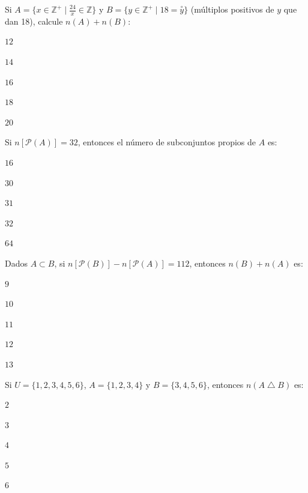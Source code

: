 \begin{tcolorbox}[
  enhanced, colback=AzulClaro!40, colframe=AzulMedio,
  arc=2pt, boxrule=0.5pt, fonttitle=\sffamily\bfseries\small,
  title={Nivel Intermedio}, left=4pt, right=4pt, top=3pt, bottom=3pt
]\end{tcolorbox}

\begin{multicols}{2}

\ejercicio Si $A = \{x \in \mathbb{Z}^{+} \mid \tfrac{24}{x} \in \mathbb{Z}\}$
y $B = \{y \in \mathbb{Z}^{+} \mid 18 = \overset{\circ}{y}\}$
(m\'ultiplos positivos de $y$ que dan 18), calcule $n(A) + n(B)$:
\begin{alternativas}
  \item $12$
  \item $14$
  \item $16$
  \item $18$
  \item $20$
\end{alternativas}

\vspace{0.3cm}

\ejercicio Si $n[\mathcal{P}(A)] = 32$, entonces el n\'umero de subconjuntos
propios de $A$ es:
\begin{alternativas}
  \item $16$
  \item $30$
  \item $31$
  \item $32$
  \item $64$
\end{alternativas}

\vspace{0.3cm}

\ejercicio Dados $A \subset B$, si $n[\mathcal{P}(B)] - n[\mathcal{P}(A)] = 112$,
entonces $n(B) + n(A)$ es:
\begin{alternativas}
  \item $9$
  \item $10$
  \item $11$
  \item $12$
  \item $13$
\end{alternativas}

\vspace{0.3cm}

\ejercicio Si $U = \{1,2,3,4,5,6\}$, $A = \{1,2,3,4\}$ y $B = \{3,4,5,6\}$,
entonces $n(A \mathbin{\triangle} B)$ es:
\begin{alternativas}
  \item $2$
  \item $3$
  \item $4$
  \item $5$
  \item $6$
\end{alternativas}


\end{multicols}
